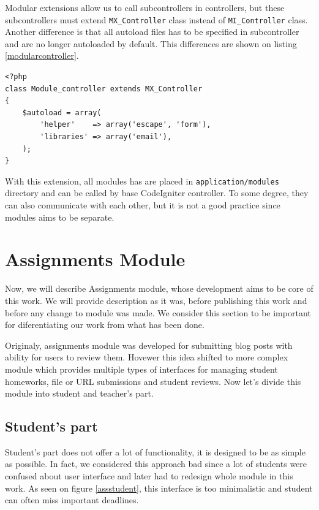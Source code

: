 Modular extensions allow us to call subcontrollers in controllers, but these subcontrollers must extend \texttt{MX\_Controller} class instead of \texttt{MI\_Controller} class. Another difference is that all autoload files has to  be specified in subcontroller and are no longer autoloaded by default. This differences are shown on listing \ref{modularcontroller}.

\begin{lstlisting}[label={modularcontroller}, caption={Module controller}]
<?php     
class Module_controller extends MX_Controller 
{
    $autoload = array(
        'helper'    => array('escape', 'form'),
        'libraries' => array('email'),
    );
}
\end{lstlisting}


With this extension, all modules has are placed in \texttt{application/modules} directory and can be called by base CodeIgniter controller. To some degree, they can also communicate with each other, but it is not a good practice since modules aims to be separate.

\section{Assignments Module}

Now, we will describe Assignments module, whose development aims to be core of this work. We will provide description as it was, before publishing this work and before any change to module was made. We consider this section to be important for diferentiating our work from what has been done.


Originaly, assignments module was developed for submitting blog posts with ability for users to review them. Hovewer this idea shifted to more complex module which provides multiple types of interfaces for managing student homeworks, file or URL submissions and student reviews. Now let's divide this module into student and teacher's part.

\subsection{Student's part}

Student's part does not offer a lot of functionality, it is designed to be as simple as possible. In fact, we considered this approach bad since a lot of students were confused about user interface and later had to redesign whole module in this work. As seen on figure \ref{assstudent}, this interface is too minimalistic and student can often miss important deadlines.

